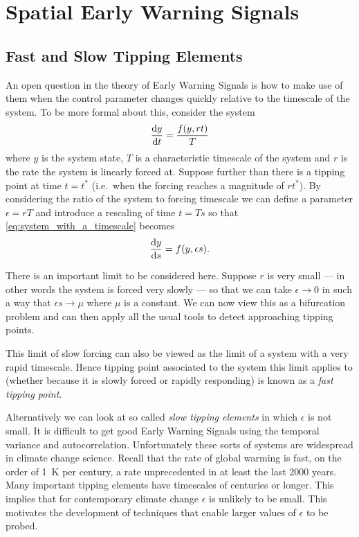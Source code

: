 \chapter{Spatial Early Warning Signals}
\graphicspath{{spatial_ews/figs}}

\section{Fast and Slow Tipping Elements}
An open question in the theory of Early Warning Signals is how to make use of them when the control parameter
changes quickly relative to the timescale of the system\cite{VanderBolt2021}.
To be more formal about this, consider the system
\begin{equation}
  \label{eq:system_with_a_timescale}
  \dv{y}{t} = \frac{f(y,rt)}{T}
\end{equation}
where $y$ is the system state, $T$ is a characteristic timescale of the system and $r$ is the rate the system is linearly forced
at. Suppose further than there is a tipping point at time $t = t^*$ (i.e.\ when the forcing reaches a magnitude of $rt^*$). By considering
the ratio of the system to forcing timescale we can define a parameter $\epsilon = rT$ and introduce a rescaling of time $t=Ts$
so that \cref{eq:system_with_a_timescale} becomes
\begin{equation}
  \label{eq:system_with_a_timescale_rescaled}
  \dv{y}{s} = f(y,\epsilon s).
\end{equation}

There is an important limit to be considered here. Suppose $r$ is very small --- in other words the system is forced very slowly --- so that we
can take $\epsilon\rightarrow 0$ in such a way that $\epsilon s \rightarrow \mu$ where $\mu$ is a constant. We can now view this as a bifurcation
problem and can then apply all the usual tools to detect approaching tipping points\cite{scheffer2009}.

This limit of slow forcing can also be viewed as the limit of a system with a very rapid timescale. Hence tipping point associated to the system
this limit applies to (whether because it is slowly forced or rapidly responding) is known as a \emph{fast tipping point}.

Alternatively we can look at so called \emph{slow tipping elements} in which $\epsilon$ is not small. It is difficult to get good Early Warning Signals
using the temporal variance and autocorrelation\cite{VanderBolt2021}. Unfortunately these sorts of systems are widespread in climate change science.
Recall that the rate of global warming is fast, on the order of \SI{1}{\kelvin} per century\cite{Osborn2021}, a rate unprecedented in at least
the last 2000 years\cite{AR6}. Many important tipping elements have timescales of centuries or longer.
This implies that for contemporary climate change $\epsilon$ is unlikely to be small. This motivates the development of techniques that enable
larger values of $\epsilon$ to be probed.

